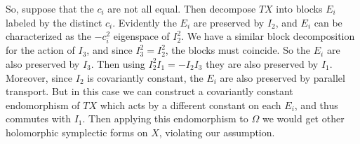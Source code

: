 \documentclass[12pt,letterpaper,reqno]{article}
\numberwithin{equation}{section}
\begin{document}
\begin{pf}
So, suppose that the $c_i$ are not all equal.
Then decompose $TX$ into blocks $E_i$ labeled by
the distinct $c_i$. Evidently the $E_i$ are preserved
by $I_2$, and $E_i$ can be characterized as the $-c_i^2$
eigenspace of $I_2^2$.
We have a similar block decomposition for the
action of $I_3$, and since $I_3^2 = I_2^2$, the blocks
must coincide. So the $E_i$ are also preserved by $I_3$.
Then using $I_2^2 I_1 = -I_2 I_3$ they are also
preserved by $I_1$.
Moreover, since $I_2$ is covariantly constant,
the $E_i$ are also preserved by parallel transport.
But in this case we can construct a covariantly constant endomorphism
of $TX$ which acts by a different constant on each $E_i$, and
thus commutes with $I_1$.
Then applying this endomorphism to $\Omega$
we would get other holomorphic symplectic forms on $X$,
violating our assumption.
\end{pf}
\end{document}
